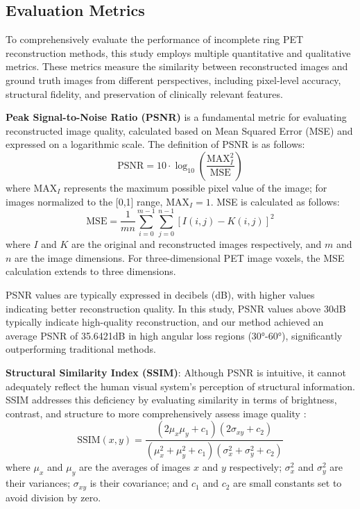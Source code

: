 \documentclass[
reprint,
superscriptaddress,
nofootinbib,
amsmath,amssymb,
aps,
prd,
]{revtex4-2}
\begin{document}
\subsection{Evaluation Metrics}

To comprehensively evaluate the performance of incomplete ring PET reconstruction methods, this study employs multiple quantitative and qualitative metrics. These metrics measure the similarity between reconstructed images and ground truth images from different perspectives, including pixel-level accuracy, structural fidelity, and preservation of clinically relevant features.


\textbf{Peak Signal-to-Noise Ratio (PSNR)} \cite{Hore2010PSNRvsSSIM} is a fundamental metric for evaluating reconstructed image quality, calculated based on Mean Squared Error (MSE) and expressed on a logarithmic scale. The definition of PSNR is as follows:
\begin{equation}
\text{PSNR} = 10 \cdot \log_{10}\left(\frac{\text{MAX}_I^2}{\text{MSE}}\right)
\end{equation}
where $\text{MAX}_I$ represents the maximum possible pixel value of the image; for images normalized to the [0,1] range, $\text{MAX}_I = 1$. MSE is calculated as follows:
\begin{equation}
\text{MSE} = \frac{1}{mn}\sum_{i=0}^{m-1}\sum_{j=0}^{n-1}[I(i,j) - K(i,j)]^2
\end{equation}
where $I$ and $K$ are the original and reconstructed images respectively, and $m$ and $n$ are the image dimensions. For three-dimensional PET image voxels, the MSE calculation extends to three dimensions.

PSNR values are typically expressed in decibels (dB), with higher values indicating better reconstruction quality. In this study, PSNR values above 30dB typically indicate high-quality reconstruction, and our method achieved an average PSNR of 35.6421dB in high angular loss regions (30°-60°), significantly outperforming traditional methods.

\textbf{Structural Similarity Index (SSIM)}: Although PSNR is intuitive, it cannot adequately reflect the human visual system's perception of structural information. SSIM addresses this deficiency by evaluating similarity in terms of brightness, contrast, and structure to more comprehensively assess image quality \cite{Wang2004SSIM}:
\begin{equation}
\text{SSIM}(x, y) = \frac{(2\mu_x\mu_y + c_1)(2\sigma_{xy} + c_2)}{(\mu_x^2 + \mu_y^2 + c_1)(\sigma_x^2 + \sigma_y^2 + c_2)}
\end{equation}
where $\mu_x$ and $\mu_y$ are the averages of images $x$ and $y$ respectively; $\sigma_x^2$ and $\sigma_y^2$ are their variances; $\sigma_{xy}$ is their covariance; and $c_1$ and $c_2$ are small constants set to avoid division by zero.
\end{document}
